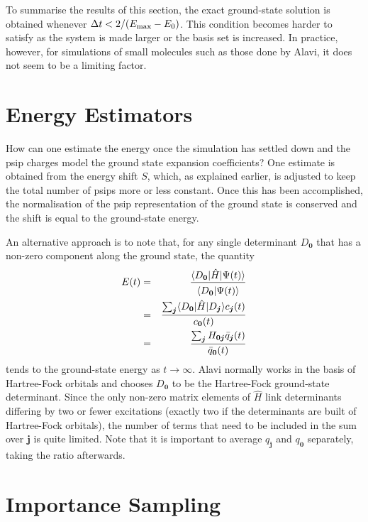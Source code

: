 \documentclass{article}
\newcommand{\bj}{\boldsymbol{j}}
\newcommand{\bzero}{\boldsymbol{0}}
\begin{document}
To summarise the results of this section, the exact ground-state
solution is obtained whenever $\Delta t < 2/(E_{\rm max} - E_0)$.
This condition becomes harder to satisfy as the system is made larger
or the basis set is increased. In practice, however, for simulations
of small molecules such as those done by Alavi, it does not seem to be
a limiting factor.


\section{Energy Estimators}
\label{sec:EnergyEstimators}

How can one estimate the energy once the simulation has settled down
and the psip charges model the ground state expansion coefficients?
One estimate is obtained from the energy shift $S$, which, as
explained earlier, is adjusted to keep the total number of psips more
or less constant. Once this has been accomplished, the normalisation
of the psip representation of the ground state is conserved and the
shift is equal to the ground-state energy.

An alternative approach is to note that, for any single determinant
$D_{\bzero}$ that has a non-zero component along the ground state, the
quantity
\begin{eqnarray*}
E(t) & = & \frac{\langle D_{\bzero} | \hat{H} | \Psi(t) 
  \rangle}{\rule{0em}{1em}
  \langle D_{\bzero} | \Psi(t) \rangle } \\
& = & 
\frac{\sum_{\bj} \langle D_{\bzero} | \hat{H} | D_{\bj} \rangle c_{\bj}(t)}
{c_{\bzero}(t)} \\
& = & \frac{\sum_{\bj} H_{\bzero\bj} \bar{q}_{\bj}(t)
  }{\bar{q}_{\bzero}(t)}
\end{eqnarray*}
tends to the ground-state energy as $t \rightarrow \infty$. Alavi
normally works in the basis of Hartree-Fock orbitals and chooses
$D_{\bzero}$ to be the Hartree-Fock ground-state determinant. Since
the only non-zero matrix elements of $\hat{H}$ link determinants
differing by two or fewer excitations (exactly two if the determinants
are built of Hartree-Fock orbitals), the number of terms that need to
be included in the sum over $\bj$ is quite limited. Note that it is
important to average $q_{\bj}$ and $q_{\bzero}$ separately, taking the
ratio afterwards.


\section{Importance Sampling}
\label{sec:ImportanceSampling}
\end{document}
